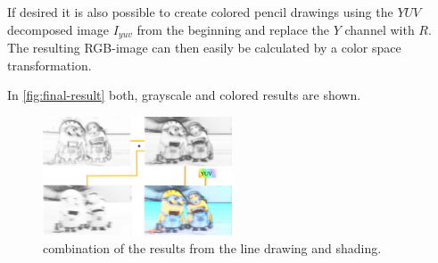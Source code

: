 If desired it is also possible to create colored pencil drawings using the $YUV$
decomposed image $I_{yuv}$ from the beginning and replace the $Y$ channel with
$R$. The resulting RGB-image can then easily be calculated by a color space
transformation.

In \autoref{fig:final-result} both, grayscale and colored results are shown.

\begin{figure}[htb]
  \centering
  \includegraphics[width=0.5\textwidth]{images/final-result.png}
  \caption{combination of the results from the line drawing and shading.}
  \label{fig:final-result}
\end{figure}
